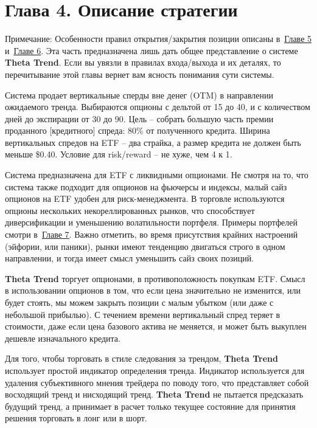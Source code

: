 \documentclass[12pt,DIV=18]{scrartcl}
\begin{document}
\section*{Глава 4. Описание стратегии}
\label{chapter4}

Примечание: Особенности правил открытия/закрытия позиции описаны в~\hyperref[chapter5]{\ul{Главе 5}} и~\hyperref[chapter6]{\ul{Главе 6}}. Эта часть предназначена лишь дать общее представление о системе \textbf{Theta Trend}. Если вы увязли в правилах входа/выхода и их деталях, то перечитывание этой главы вернет вам ясность понимания сути системы.

\bigskip

Система продает вертикальные сперды вне денег (OTM) в направлении ожидаемого тренда. Выбираются опционы с дельтой от 15 до 40, и с количеством дней до экспирации от 30 до 90. Цель -- собрать большую часть премии проданного [кредитного] спреда: 80\% от полученного кредита. Ширина вертикальных спредов на ETF -- два страйка, а размер кредита не должен быть меньше \$0.40. Условие для risk/reward -- не хуже, чем 4 к 1.

\bigskip

Система предназначена для ETF с ликвидными опционами. Не смотря на то, что система также подходит для опционов на фьючерсы и индексы, малый сайз опционов на ETF удобен для риск-менеджмента. В торговле используются опционы нескольких некореллированных рынков, что способствует диверсификации и уменьшению волатильности портфеля. Примеры портфелей смотри в~\hyperref[chapter7]{\ul{Главе 7}}. Важно отметить, во время присутствия крайних настроений (эйфории, или паники), рынки  имеют тенденцию двигаться строго в одном направлении, и тогда имеет смысл уменьшить сайз своих позиций.

\bigskip

\textbf{Theta Trend} торгует опционами, в противоположность покупкам ETF. Смысл в использовании опционов в том, что если цена значительно не изменится, или будет стоять, мы можем закрыть позиции с малым убытком (или даже с небольшой прибылью). С течением времени вертикальный спред теряет в стоимости, даже если цена базового актива не меняется, и может быть выкуплен дешевле изначального кредита.

\bigskip

Для того, чтобы торговать в стиле следования за трендом, \textbf{Theta Trend} использует простой индикатор определения тренда. Индикатор используется для удаления субъективного мнения трейдера по поводу того, что представляет собой восходящий тренд и нисходящий тренд. \textbf{Theta Trend} не пытается предсказать будущий тренд, а принимает в расчет только текущее состояние для принятия решения торговать в лонг или в шорт.
\end{document}

